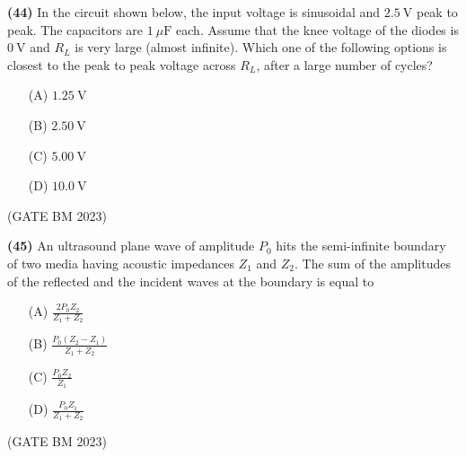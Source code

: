 \documentclass[journal]{IEEEtran}
\numberwithin{equation}{enumi}
\numberwithin{figure}{enumi}
\begin{document}
 \textbf{(44)} 
In the circuit shown below, the input voltage is sinusoidal and \(2.5~\text{V}\) peak to peak. The capacitors are \(1~\mu\text{F}\) each. Assume that the knee voltage of the diodes is \(0~\text{V}\) and \(R_L\) is very large (almost infinite). Which one of the following options is closest to the peak to peak voltage across \(R_L\), after a large number of cycles?

\begin{figure}[H]
\centering
{}%

\label{fig:my_label}
\end{figure}
\begin{itemize}
    \item[(A)] \(1.25~\text{V}\)
    \item[(B)] \(2.50~\text{V}\)
    \item[(C)] \(5.00~\text{V}\)
    \item[(D)] \(10.0~\text{V}\)
\end{itemize}
\hfill (GATE BM 2023)

\textbf{(45)} 
An ultrasound plane wave of amplitude \( P_0 \) hits the semi-infinite boundary of two media having acoustic impedances \( Z_1 \) and \( Z_2 \). The sum of the amplitudes of the reflected and the incident waves at the boundary is equal to 

\vspace{0.3cm}

\begin{itemize}
    \item[(A)] \( \frac{2 P_0 Z_2}{Z_1 + Z_2} \)
    \item[(B)] \( \frac{P_0 (Z_2 - Z_1)}{Z_1 + Z_2} \)
    \item[(C)] \( \frac{P_0 Z_2}{Z_1} \)
    \item[(D)] \( \frac{P_0 Z_1}{Z_1 + Z_2} \)
\end{itemize}
\hfill (GATE BM 2023)
\end{document}
